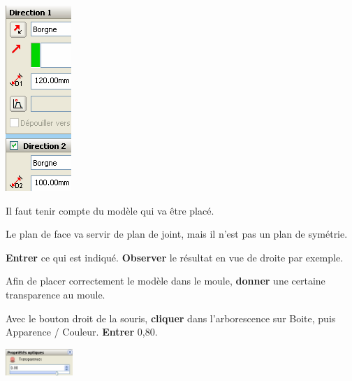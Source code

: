 \begin{minipage}{0.29\linewidth} 
 \includegraphics[width=0.5\linewidth]{img/SW-036.png}
\end{minipage}
\hfill
\begin{minipage}{0.7\linewidth}
Il faut tenir compte du modèle qui va être placé.

Le plan de face va servir de plan de joint, mais il n'est pas un plan de symétrie.

\textbf{Entrer} ce qui est indiqué. \textbf{Observer} le résultat en vue de droite par exemple.

Afin de placer correctement le modèle dans le moule, \textbf{donner} une certaine transparence au moule. 

Avec le bouton droit de la souris, \textbf{cliquer} dans l'arborescence sur Boite, puis Apparence / Couleur. \textbf{Entrer} 0,80.

\includegraphics[height=1cm]{img/SW-037.png}
\end{minipage}
 
